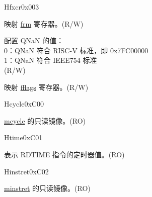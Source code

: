 \begin{register}{H}{fxcr}{0x003}\label{regdesc:FXCR}
%
%
%
%
%
\regnewline%
\begin{regdesc}\begin{reglist}
\label{fielddesc:FXCR_FRM}\item [FRM] 映射 \hyperref[regdesc:FRM]{frm} 寄存器。(R/W)
\label{fielddesc:FXCR_DQNaN}\item [DQNaN] 配置 QNaN 的值：\\
0：QNaN 符合 RISC-V 标准，即 0x7FC00000\\
1：QNaN 符合 IEEE754 标准\\
(R/W)
\label{fielddesc:FXCR_FFLAGS}\item [FFLAGS] 映射 \hyperref[regdesc:FFLAGS]{fflags} 寄存器。(R/W)
\end{reglist}\end{regdesc}
\end{register}

\begin{register}{H}{cycle}{0xC00}\label{regdesc:CYCLE}
%
\regnewline%
\begin{regdesc}\begin{reglist}
\label{fielddesc:CYCLE}\item [CYCLE] \hyperref[regdesc:MCYCLE]{mcycle} 的只读镜像。(RO)
\end{reglist}\end{regdesc}
\end{register}

\begin{register}{H}{time}{0xC01}\label{regdesc:TIME}
%
\regnewline%
\begin{regdesc}\begin{reglist}
\label{fielddesc:TIME}\item [TIME] 表示 RDTIME 指令的定时器值。(RO)
\end{reglist}\end{regdesc}
\end{register}

\begin{register}{H}{instret}{0xC02}\label{regdesc:INSTRET}
%
\regnewline%
\begin{regdesc}\begin{reglist}
\label{fielddesc:INSTRET}\item [INSTRET] \hyperref[regdesc:MINSTRET]{minstret} 的只读镜像。(RO)
\end{reglist}\end{regdesc}
\end{register}

